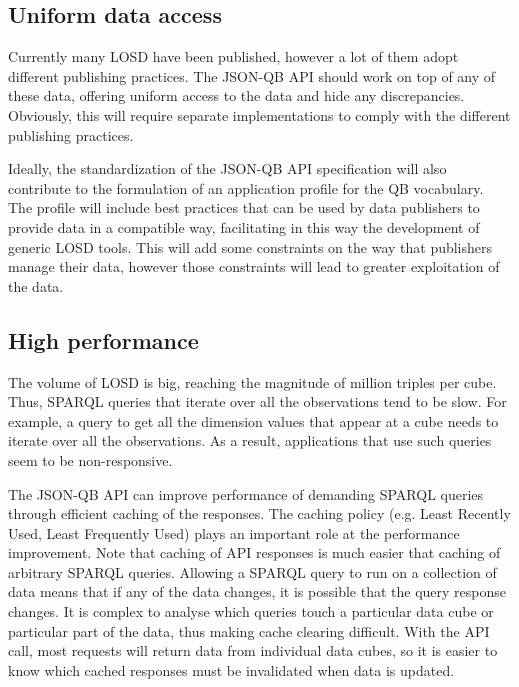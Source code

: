 \documentclass{llncs}
\begin{document}




\subsection{Uniform data access}

Currently many LOSD have been published, however a lot of them adopt different publishing practices. The JSON-QB API should work on top of any of these data, offering uniform access to the data and hide any discrepancies. Obviously, this will require separate implementations to comply with the different publishing practices. 

Ideally, the standardization of the JSON-QB API specification will also contribute to the formulation of an application profile for the QB vocabulary. The profile will include best practices that can be used by data publishers to provide data in a compatible way, facilitating in this way the development of generic LOSD tools. This will add some constraints on the way that publishers manage their data, however those constraints will lead to greater exploitation of the data. 


\subsection{High performance}

The volume of LOSD is big, reaching the magnitude of million triples per cube. Thus, SPARQL queries that iterate over all the observations tend to be slow. For example, a query to get all the dimension values that appear at a cube needs to iterate over all the observations. As a result, applications that use such queries seem to be non-responsive. 

The JSON-QB API can improve performance of demanding SPARQL queries through efficient caching of the responses. The caching policy (e.g. Least Recently Used, Least Frequently Used) plays an important role at the performance improvement. Note that caching of API responses is much easier that caching of arbitrary SPARQL queries. Allowing a SPARQL query to run on a collection of data means that if any of the data changes, it is possible that the query response changes.  It is complex to analyse which queries touch a particular data cube or particular part of the data, thus making cache clearing difficult.  With the API call, most requests will return data from individual data cubes, so it is easier to know which cached responses must be invalidated when data is updated.
\end{document}
